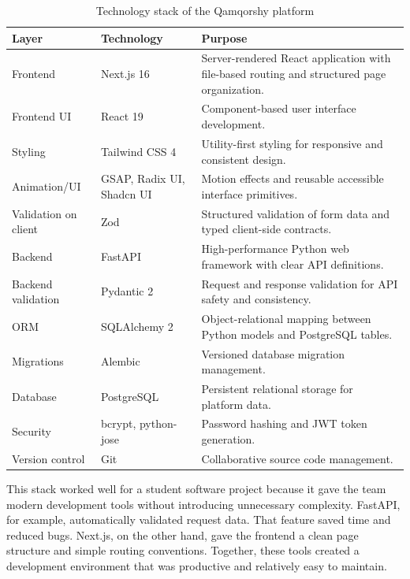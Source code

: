\documentclass[12pt,a4paper]{article}
\begin{document}
\begin{table}[H]
\centering
\caption{Technology stack of the Qamqorshy platform}
\label{tab:stack}
\small
\begin{tabularx}{\textwidth}{>{\RaggedRight\arraybackslash}p{2.5cm} >{\RaggedRight\arraybackslash}p{2.7cm} Y}
\toprule
\textbf{Layer} & \textbf{Technology} & \textbf{Purpose} \\
\midrule
Frontend & Next.js 16 & Server-rendered React application with file-based routing and structured page organization. \\
Frontend UI & React 19 & Component-based user interface development. \\
Styling & Tailwind CSS 4 & Utility-first styling for responsive and consistent design. \\
Animation/UI & GSAP, Radix UI, Shadcn UI & Motion effects and reusable accessible interface primitives. \\
Validation on client & Zod & Structured validation of form data and typed client-side contracts. \\
Backend & FastAPI & High-performance Python web framework with clear API definitions. \\
Backend validation & Pydantic 2 & Request and response validation for API safety and consistency. \\
ORM & SQLAlchemy 2 & Object-relational mapping between Python models and PostgreSQL tables. \\
Migrations & Alembic & Versioned database migration management. \\
Database & PostgreSQL & Persistent relational storage for platform data. \\
Security & bcrypt, python-jose & Password hashing and JWT token generation. \\
Version control & Git & Collaborative source code management. \\
\bottomrule
\end{tabularx}
\normalsize
\end{table}

This stack worked well for a student software project because it gave the team modern development tools without introducing unnecessary complexity. FastAPI, for example, automatically validated request data. That feature saved time and reduced bugs. Next.js, on the other hand, gave the frontend a clean page structure and simple routing conventions. Together, these tools created a development environment that was productive and relatively easy to maintain.
\end{document}
